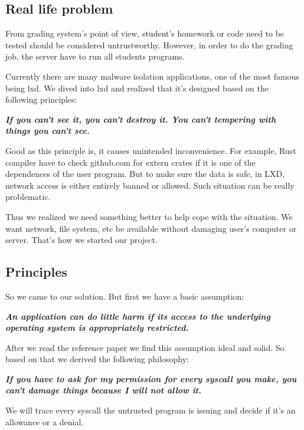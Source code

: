 \documentclass[conference,compsoc]{IEEEtran}
\begin{document}
	\subsection{Real life problem}
		\par
			From grading system's point of view, student's homework or code need to be tested should be considered untrustworthy. 
			However, in order to do the grading job, the server have to run all students programs.
		\par
			Currently there are many malware isolation applications, one of the most famous being lxd. 
			We dived into lxd and realized that it's designed based on the following principles:
		\par 
			\emph{\textbf{
				If you can't see it, you can't destroy it. 
				You can't tempering with things you can't see.
			}}
		\par
			Good as this principle is, it causes unintended inconvenience. 
			For example, Rust compiler have to check github.com for extern crates if it is one of the dependences of the user program. 
			But to make sure the data is safe, in LXD, network access is either entirely banned or allowed.
			Such situation can be really problematic.
		\par
			Thus we realized we need something better to help cope with the situation. 
			We want network, file system, etc be available without damaging user's computer or server. 
			That's how we started our project.
		\subsection{Principles}
			\par
				So we came to our solution. 
				But first we have a basic assumption:
			\par
				\emph{\textbf{
					An application can do little harm if its access to the underlying operating system is appropriately restricted.\cite{SecSandBox}
				}}
			\par
				After we read the reference paper we find this assumption ideal and solid. 
				So based on that we derived the following philosophy:
			\par
				\emph{\textbf{
					If you have to ask for my permission for every syscall you make, you can't damage things because I will not allow it.
				}}
			\par
				We will trace every syscall the untrusted program is issuing and decide if it's an allowance or a denial.
\end{document}
